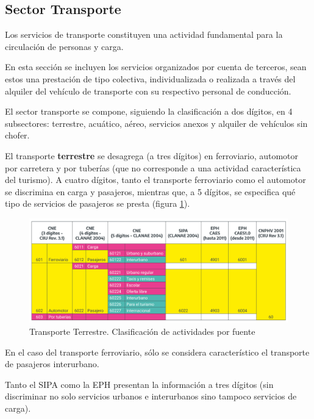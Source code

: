 \documentclass[
  openany]{book}
\begin{document}
\hypertarget{sector-transporte}{%
\subsection{Sector Transporte}\label{sector-transporte}}

Los servicios de transporte constituyen una actividad fundamental para la circulación de personas y carga.

En esta sección se incluyen los servicios organizados por cuenta de terceros, sean estos una prestación de tipo colectiva, individualizada o realizada a través del alquiler del vehículo de transporte con su respectivo personal de conducción.

El sector transporte se compone, siguiendo la clasificación a dos dígitos, en 4 subsectores: terrestre, acuático, aéreo, servicios anexos y alquiler de vehículos sin chofer.

El transporte \textbf{terrestre} se desagrega (a tres dígitos) en ferroviario, automotor por carretera y por tuberías (que no corresponde a una actividad característica del turismo).
A cuatro dígitos, tanto el transporte ferroviario como el automotor se discrimina en carga y pasajeros, mientras que, a 5 dígitos, se especifica qué tipo de servicios de pasajeros se presta (figura \ref{fig:empleofuentes6}).

\begin{figure}

{\centering \includegraphics[width=1\linewidth]{imagenes/figura3.6} 

}

\caption{Transporte Terrestre. Clasificación de actividades por fuente}\label{fig:empleofuentes6}
\end{figure}

En el caso del transporte ferroviario, sólo se considera característico el transporte de pasajeros interurbano.

Tanto el SIPA como la EPH presentan la información a tres dígitos (sin discriminar no solo servicios urbanos e interurbanos sino tampoco servicios de carga).
\end{document}
